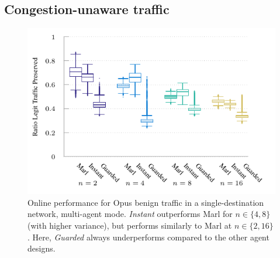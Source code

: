 \documentclass[10pt, times, conference, letterpaper]{IEEEtran}
\begin{document}
\subsection{Congestion-unaware traffic}
%	
%	
\begin{figure}
	\centering
	\includegraphics[width=0.9\linewidth]{../plots/tnsm-udp-box-separate}
	
	\caption{
		Online performance for Opus benign traffic in a single-destination network, multi-agent mode.
		\emph{Instant} outperforms Marl for $n \in \{4, 8\}$ (with higher variance), but performs similarly to Marl at $n\in \{2, 16\}$.
		Here, \emph{Guarded} always underperforms compared to the other agent designs.
		\vspace{-1em}
		\label{fig:udp-tree-box}
	}
\end{figure}
\end{document}
